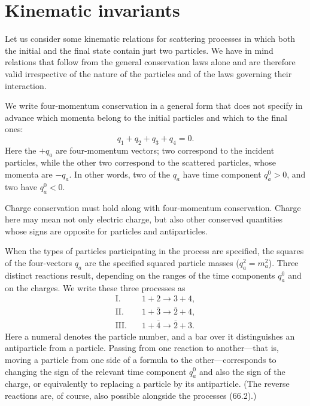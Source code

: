 \section{Kinematic invariants}

Let us consider some kinematic relations for scattering processes in which both the initial and the final state contain just two particles. We have in mind relations that follow from the general conservation laws alone and are therefore valid irrespective of the nature of the particles and of the laws governing their interaction.

We write four-momentum conservation in a general form that does not specify in advance which momenta belong to the initial particles and which to the final ones:
\begin{equation}
q_1+q_2+q_3+q_4=0.
\tag{66.1}
\end{equation}
Here the $+q_a$ are four-momentum vectors; two correspond to the incident particles, while the other two correspond to the scattered particles, whose momenta are $-q_a$. In other words, two of the $q_a$ have time component $q_a^0>0$, and two have $q_a^0<0$.

Charge conservation must hold along with four-momentum conservation. Charge here may mean not only electric charge, but also other conserved quantities whose signs are opposite for particles and antiparticles.

When the types of particles participating in the process are specified, the squares of the four-vectors $q_a$ are the specified squared particle masses ($q_a^2=m_a^2$). Three distinct reactions result, depending on the ranges of the time components $q_a^0$ and on the charges. We write these three processes as
\begin{equation}
\begin{aligned}
\mathrm I.\quad &1+2\to3+4,\\
\mathrm{II}.\quad &1+\overline3\to\overline2+4,\\
\mathrm{III}.\quad &1+\overline4\to\overline2+3.
\end{aligned}
\tag{66.2}
\end{equation}
Here a numeral denotes the particle number, and a bar over it distinguishes an antiparticle from a particle. Passing from one reaction to another---that is, moving a particle from one side of a formula to the other---corresponds to changing the sign of the relevant time component $q_a^0$ and also the sign of the charge, or equivalently to replacing a particle by its antiparticle. (The reverse reactions are, of course, also possible alongside the processes (66.2).)

